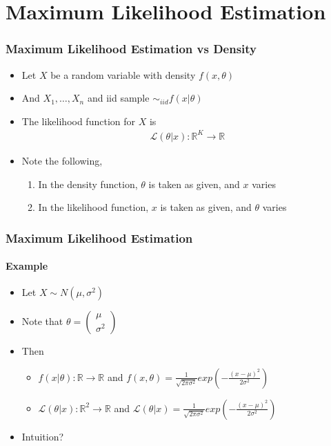 \documentclass[
  shownotes,
  xcolor={svgnames},
  hyperref={colorlinks,citecolor=DarkBlue,linkcolor=DarkRed,urlcolor=DarkBlue}
  , aspectratio=169]{beamer}
\begin{document}
\section{Maximum Likelihood Estimation}
\begin{frame}[fragile]
\frametitle{Maximum Likelihood Estimation vs Density}
\begin{itemize}
\item Let $X$ be a random variable with density $f(x,\theta)$ 
\medskip
\item And $X_1,\dots,X_n$ and iid sample $\sim_{iid}f(x|\theta)$
\medskip
\item The likelihood function for $X$ is
\medskip
\begin{align}
\mathcal{L}(\theta|x):\mathbb{R}^K \rightarrow \mathbb{R}
\end{align}
\item Note the following,
\medskip
\begin{enumerate}
  \item In the density function, $\theta$ is taken as given, and $x$ varies
  \medskip
  \item In the likelihood function, $x$ is taken as given, and $\theta$ varies
\end{enumerate}
\end{itemize}

 \end{frame}
\begin{frame}[fragile]
\frametitle{Maximum Likelihood Estimation}
\framesubtitle{Example}

\begin{itemize}
\item Let $X\sim N(\mu,\sigma^2)$
\medskip
\item Note that $
 \theta=\left(\begin{array}{c}
 \mu\\
 \sigma^{2}
 \end{array}\right)$
\medskip
 \item Then 
 \medskip
   \begin{itemize}
     \item  $f(x|\theta) : \mathbb{R}\rightarrow  \mathbb{R}$ and $f(x,\theta)=\frac{1}{\sqrt{2\pi\sigma^{2}}}exp\left(- \frac{(x-\mu)^2}{2\sigma^2} \right)$
     \medskip
     \item  $ \mathcal{L}(\theta|x) : \mathbb{R}^2 \rightarrow  \mathbb{R}$ and  $\mathcal{L}(\theta|x) =\frac{1}{\sqrt{2\pi\sigma^{2}}}exp\left(- \frac{(x-\mu)^2}{2\sigma^2} \right)$
   \end{itemize}
\medskip
   \item Intuition?
\end{itemize}

\end{frame}
\end{document}
